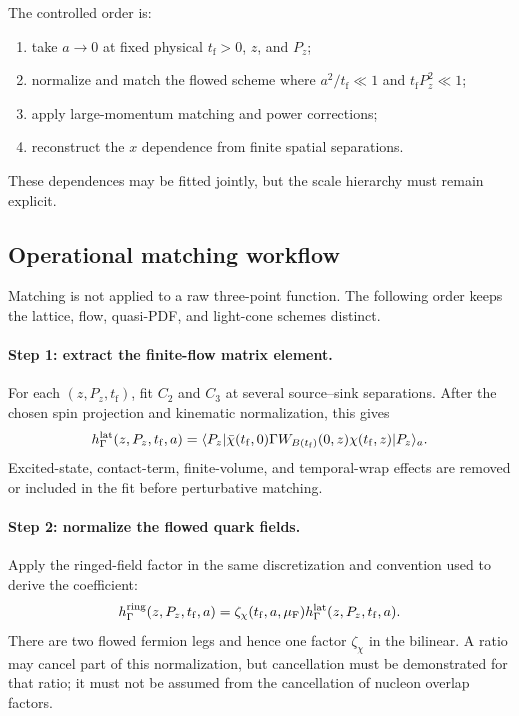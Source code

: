 \documentclass[11pt]{article}
\numberwithin{equation}{section}
\newcommand{\tf}{t_{\mathrm f}}
\begin{document}
The controlled order is:
\begin{enumerate}
  \item take \(a\to0\) at fixed physical \(\tf>0\), \(z\), and \(P_z\);
  \item normalize and match the flowed scheme where \(a^2/\tf\ll1\) and
        \(\tf P_z^2\ll1\);
  \item apply large-momentum matching and power corrections;
  \item reconstruct the \(x\) dependence from finite spatial separations.
\end{enumerate}
These dependences may be fitted jointly, but the scale hierarchy must remain
explicit.

\subsection{Operational matching workflow}
\label{sec:matching-workflow}

Matching is not applied to a raw three-point function.  The following order
keeps the lattice, flow, quasi-PDF, and light-cone schemes distinct.

\paragraph{Step 1: extract the finite-flow matrix element.}
For each \((z,P_z,\tf)\), fit \(C_2\) and \(C_3\) at several source--sink
separations.  After the chosen spin projection and kinematic normalization,
this gives
\begin{equation}
  h_{\Gamma}^{\rm lat}(z,P_z,\tf,a)
  =
  \langle P_z|
  \bar\chi(\tf,0)\Gamma W_{B(\tf)}(0,z)\chi(\tf,z)
  |P_z\rangle_a .
  \label{eq:matching-step-lattice-matrix-element}
\end{equation}
Excited-state, contact-term, finite-volume, and temporal-wrap effects are
removed or included in the fit before perturbative matching.

\paragraph{Step 2: normalize the flowed quark fields.}
Apply the ringed-field factor in the same discretization and convention used
to derive the coefficient:
\begin{equation}
  h_{\Gamma}^{\rm ring}(z,P_z,\tf,a)
  =\zeta_\chi(\tf,a,\mu_{\rm F})
   h_{\Gamma}^{\rm lat}(z,P_z,\tf,a).
  \label{eq:matching-step-ringed}
\end{equation}
There are two flowed fermion legs and hence one factor \(\zeta_\chi\) in the
bilinear.  A ratio may cancel part of this normalization, but cancellation
must be demonstrated for that ratio; it must not be assumed from the
cancellation of nucleon overlap factors.
\end{document}
